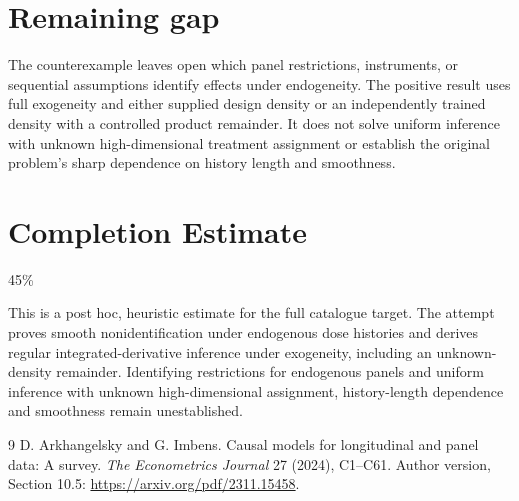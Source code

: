 \documentclass[11pt]{article}
\theoremstyle{remark}
\begin{document}
\section*{Remaining gap}
The counterexample leaves open which panel restrictions, instruments, or sequential assumptions identify effects under endogeneity. The positive result uses full exogeneity and either supplied design density or an independently trained density with a controlled product remainder. It does not solve uniform inference with unknown high-dimensional treatment assignment or establish the original problem's sharp dependence on history length and smoothness.

\section{Completion Estimate}
45\%

This is a post hoc, heuristic estimate for the full catalogue target.
The attempt proves smooth nonidentification under endogenous dose histories and derives regular integrated-derivative inference under exogeneity, including an unknown-density remainder. Identifying restrictions for endogenous panels and uniform inference with unknown high-dimensional assignment, history-length dependence and smoothness remain unestablished.

\begin{thebibliography}{9}
 D. Arkhangelsky and G. Imbens. Causal models for longitudinal and panel data: A survey. \emph{The Econometrics Journal} 27 (2024), C1--C61. Author version, Section 10.5: \url{https://arxiv.org/pdf/2311.15458}.
\end{thebibliography}
\end{document}
